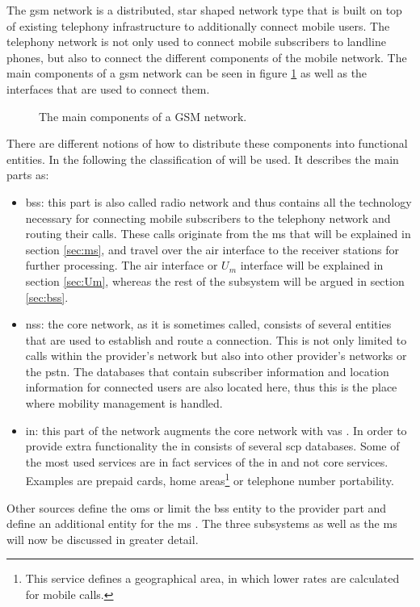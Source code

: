 The \gls{gsm} network is a distributed, star shaped network type that is built on top of existing telephony infrastructure to additionally connect mobile users.
The telephony network is not only used to connect mobile subscribers to landline phones, but also to connect the different components of the mobile network.
The main components of a \gls{gsm} network can be seen in figure \ref{fig:gsm_network} as well as the interfaces that are used to connect them.
\begin{figure}
\caption{The main components of a GSM network.}
\label{fig:gsm_network}
\end{figure}
There are different notions of how to distribute these components into functional entities.
In the following the classification of \cite{kommsys2006} will be used.
It describes the main parts as:
\begin{itemize}
	\item \gls{bss}: this part is also called radio network and thus contains all the technology necessary for connecting mobile subscribers to the telephony network and routing their calls. 
	These calls originate from the \gls{ms} that will be explained in section \ref{sec:ms}, and travel over the air interface to the receiver stations for further processing.
	The air interface or $U_m$ interface will be explained in section \ref{sec:Um}, whereas the rest of the subsystem will be argued in section \ref{sec:bss}.
	\item \gls{nss}: the core network, as it is sometimes called, consists of several entities that are used to establish and route a connection.
	This is not only limited to calls within the provider's network but also into other provider's networks or the \gls{pstn}.
	The databases that contain subscriber information and location information for connected users are also located here, thus this is the place where mobility management is handled.
	\item \gls{in}: this part of the network augments the core network with \gls{vas} \cite{ITU1200}.
	In order to provide extra functionality the \gls{in} consists of several \gls{scp} databases.
	Some of the most used services are in fact services of the \gls{in} and not core services.
	Examples are prepaid cards, home areas\footnote{This service defines a geographical area, in which lower rates are calculated for mobile calls.} or telephone number portability.
\end{itemize}
Other sources define the \gls{oms} \cite{GSM2009} or limit the \gls{bss} entity to the provider part and define an additional entity for the \gls{ms} \cite{overview1994, overview1996}.
The three subsystems as well as the \gls{ms} will now be discussed in greater detail.


